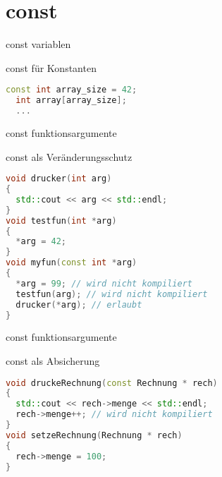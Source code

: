 \section{const}
\begin{frame}[fragile]{const variablen}

\begin{block}{const für Konstanten}
	\begin{lstlisting}[language=C++]
  const int array_size = 42;
  int array[array_size];
  ...
	\end{lstlisting}
\end{block}

\end{frame}
\begin{frame}[fragile]{const funktionsargumente}

\begin{block}{const als Veränderungsschutz}
\begin{small}
	\begin{lstlisting}[language=C++]
void drucker(int arg)
{
  std::cout << arg << std::endl;
}
void testfun(int *arg)
{
  *arg = 42;
}
void myfun(const int *arg)
{
  *arg = 99; // wird nicht kompiliert
  testfun(arg); // wird nicht kompiliert
  drucker(*arg); // erlaubt
}
	\end{lstlisting}
	\end{small}
\end{block}

\end{frame}
\begin{frame}[fragile]{const funktionsargumente}

\begin{block}{const als Absicherung}
	\begin{lstlisting}[language=C++]
void druckeRechnung(const Rechnung * rech)
{
  std::cout << rech->menge << std::endl;
  rech->menge++; // wird nicht kompiliert
}
void setzeRechnung(Rechnung * rech)
{
  rech->menge = 100;
}
	\end{lstlisting}
\end{block}


\end{frame}
